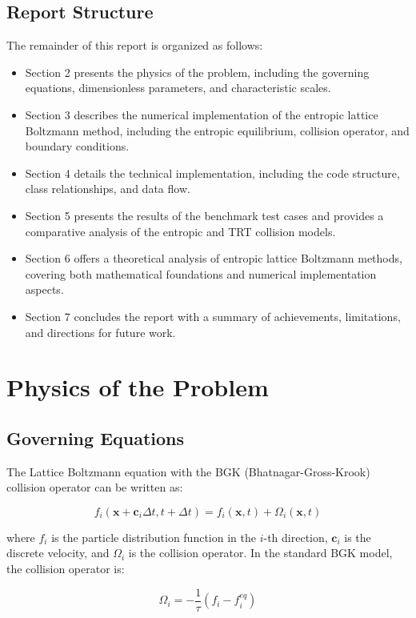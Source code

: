 \documentclass[12pt,a4paper]{article}
\begin{document}
\subsection{Report Structure}
The remainder of this report is organized as follows:
\begin{itemize}
    \item Section 2 presents the physics of the problem, including the governing equations, dimensionless parameters, and characteristic scales.
    \item Section 3 describes the numerical implementation of the entropic lattice Boltzmann method, including the entropic equilibrium, collision operator, and boundary conditions.
    \item Section 4 details the technical implementation, including the code structure, class relationships, and data flow.
    \item Section 5 presents the results of the benchmark test cases and provides a comparative analysis of the entropic and TRT collision models.
    \item Section 6 offers a theoretical analysis of entropic lattice Boltzmann methods, covering both mathematical foundations and numerical implementation aspects.
    \item Section 7 concludes the report with a summary of achievements, limitations, and directions for future work.
\end{itemize}

\section{Physics of the Problem}

\subsection{Governing Equations}
The Lattice Boltzmann equation with the BGK (Bhatnagar-Gross-Krook) collision operator can be written as:

\begin{equation}
f_i(\mathbf{x} + \mathbf{c}_i \Delta t, t + \Delta t) = f_i(\mathbf{x}, t) + \Omega_i(\mathbf{x}, t)
\end{equation}

where $f_i$ is the particle distribution function in the $i$-th direction, $\mathbf{c}_i$ is the discrete velocity, and $\Omega_i$ is the collision operator. In the standard BGK model, the collision operator is:

\begin{equation}
\Omega_i = -\frac{1}{\tau}(f_i - f_i^{eq})
\end{equation}
\end{document}
